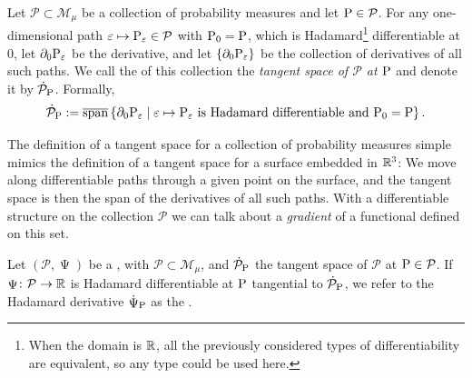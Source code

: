 \documentclass[a4,danish]{article}
\DeclareMathOperator{\TT}{\Psi}
\begin{document}
\begin{definition}
  Let $\mathcal{P} \subset \mathcal{M}_{\mu}$ be a collection of probability measures and let
  $\P \in \mathcal{P}$. For any one-dimensional path
  $\epsilon \mapsto \P_{\epsilon} \in \mathcal{P}$ with $\P_0 =\P$, which is Hadamard\footnote{When
    the domain is $\R$, all the previously considered types of differentiability are equivalent, so
    any type could be used here.} differentiable at 0, let $\partial_0\P_{\epsilon}$ be the
  derivative, and let $\{\partial_0\P_{\epsilon}\}$ be the collection of derivatives of all such paths. We call
  the  of this collection the \textit{tangent space of
    $\mathcal{P}$ at $\P$} and denote it by $\dot{\mathcal{P}}_{\P}$. Formally,
  \begin{equation*}
    \dot{\mathcal{P}}_{\P}
    := \overline{\mathrm{span}}
    \left\{ \partial_0\P_{\epsilon}
      \midd \epsilon \mapsto \P_{\epsilon} \text{ is Hadamard differentiable and } \P_0 = \P  \right\}.
  \end{equation*}
\end{definition}

The definition of a tangent space for a collection of probability measures simple mimics the
definition of a tangent space for a surface embedded in $\R^3$: We move along differentiable paths
through a given point on the surface, and the tangent space is then the span of the derivatives of
all such paths. With a differentiable structure on the collection $\mathcal{P}$ we can talk about a
\textit{gradient} of a functional defined on this set.

\begin{definition}
  Let $(\mathcal{P}, \TT)$ be a , with
  $\mathcal{P} \subset \mathcal{M}_{\mu}$, and
  $\dot{\mathcal{P}}_{\P}$ the tangent space of $\mathcal{P}$ at
  $\P \in \mathcal{P}$. If $\TT \colon \mathcal{P} \rightarrow \R$ is
  Hadamard differentiable at $\P$ tangential to
  $\dot{\mathcal{P}}_{\P}$, we refer to the Hadamard derivative
  $\dot{\TT}_{\P}$ as the .
\end{definition}
\end{document}

